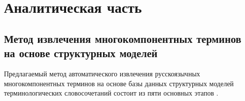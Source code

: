 \section{Аналитическая часть}


\subsection{Метод извлечения многокомпонентных терминов на основе структурных моделей}

Предлагаемый метод автоматического извлечения русскоязычных многокомпонентных терминов на основе базы данных структурных моделей терминологических словосочетаний состоит из пяти основных этапов \cite{My_article_2021}.

